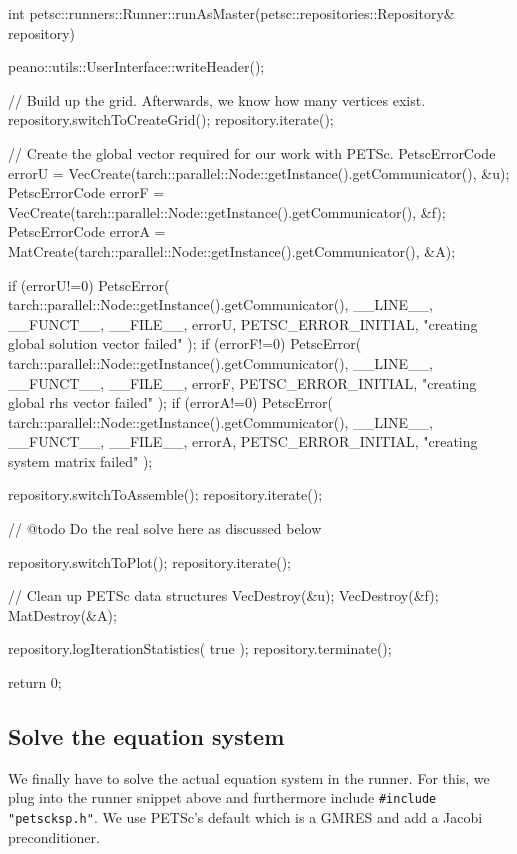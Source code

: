 \begin{code}
int petsc::runners::Runner::runAsMaster(petsc::repositories::Repository& repository) {
  peano::utils::UserInterface::writeHeader();

  // Build up the grid. Afterwards, we know how many vertices exist.
  repository.switchToCreateGrid(); repository.iterate();

  // Create the global vector required for our work with PETSc.
  PetscErrorCode errorU   = 
    VecCreate(tarch::parallel::Node::getInstance().getCommunicator(), &u);
  PetscErrorCode errorF = 
    VecCreate(tarch::parallel::Node::getInstance().getCommunicator(), &f);
  PetscErrorCode errorA   = 
    MatCreate(tarch::parallel::Node::getInstance().getCommunicator(), &A);

  if (errorU!=0) {
    PetscError( tarch::parallel::Node::getInstance().getCommunicator(),
      __LINE__,  __FUNCT__,  __FILE__, errorU,  PETSC_ERROR_INITIAL,
      "creating global solution vector failed" );
  }
  if (errorF!=0) {
    PetscError( tarch::parallel::Node::getInstance().getCommunicator(),
      __LINE__,  __FUNCT__,  __FILE__, errorF,  PETSC_ERROR_INITIAL,
      "creating global rhs vector failed" );
  }
  if (errorA!=0) {
    PetscError( tarch::parallel::Node::getInstance().getCommunicator(),
      __LINE__,  __FUNCT__,  __FILE__, errorA,  PETSC_ERROR_INITIAL,
      "creating system matrix failed" );
  }
  
  repository.switchToAssemble(); repository.iterate();

  // @todo Do the real solve here as discussed below

  repository.switchToPlot(); repository.iterate();

  // Clean up PETSc data structures
  VecDestroy(&u);
  VecDestroy(&f);
  MatDestroy(&A);

  repository.logIterationStatistics( true );
  repository.terminate();

  return 0;
}
\end{code}




\subsection{Solve the equation system}


We finally have to solve the actual equation system in the runner. For this, we
plug into the runner snippet above and furthermore include
\texttt{\#include "petscksp.h"}. We use PETSc's default which is a GMRES
and add a Jacobi preconditioner.

